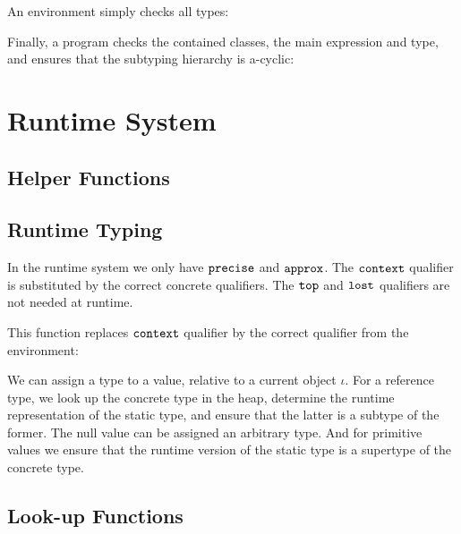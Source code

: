 \ottdefnoverrideaux


An environment simply checks all types:

\ottdefnswfenv


Finally, a program checks the contained classes, the main expression
and type, and ensures that the subtyping hierarchy is a-cyclic:

\ottdefnwfprg



\section{Runtime System}
\label{rt}

\subsection{Helper Functions}

\ottdefncreation

\ottdefnupdate


\subsection{Runtime Typing}

In the runtime system we only have $ \texttt{\upshape{precise}\,\!} $ and $ \texttt{\upshape{approx}\,\!} $.
The $ \texttt{\upshape{context}\,\!} $ qualifier is substituted by the correct concrete
qualifiers.
The $ \texttt{\upshape{top}\,\!} $ and $ \texttt{\upshape{lost}\,\!} $ qualifiers are not needed at runtime.

This function replaces $ \texttt{\upshape{context}\,\!} $ qualifier by the correct
qualifier from the environment:

\ottdefnsTXXrT


We can assign a type to a value, relative to a current object
$\iota$.
For a reference type, we look up the concrete type in the heap,
determine the runtime representation of the static type, and ensure
that the latter is a subtype of the former.
The null value can be assigned an arbitrary type.
And for primitive values we ensure that the runtime version of the
static type is a supertype of the concrete type.

\ottdefnrttyping


\subsection{Look-up Functions}

